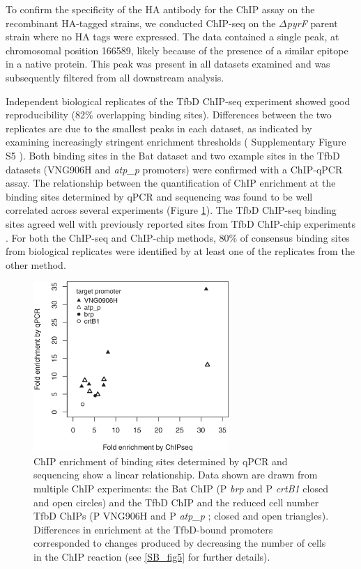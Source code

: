 To confirm the specificity of the HA antibody for the ChIP assay on the recombinant HA-tagged strains, we conducted ChIP-seq on the $\Delta${\em pyrF} parent strain where no HA tags were expressed. The data contained a single peak, at chromosomal position 166589, likely because of the presence of a similar epitope in a native protein. This peak was present in all datasets examined and was subsequently filtered from all downstream analysis.

Independent biological replicates of the TfbD ChIP-seq experiment showed good reproducibility (82\% overlapping binding sites). Differences between the two replicates are due to the smallest peaks in each dataset, as indicated by examining increasingly stringent enrichment thresholds ( Supplementary Figure S5 ). Both binding sites in the Bat dataset and two example sites in the TfbD datasets (VNG906H and {\em atp\_p} promoters) were confirmed with a ChIP-qPCR assay. The relationship between the quantification of ChIP enrichment at the binding sites determined by qPCR and sequencing was found to be well correlated across several experiments (Figure \ref{SB_fig4}). The TfbD ChIP-seq binding sites agreed well with previously reported sites from TfbD ChIP-chip experiments \cite{facciotti_general_2007}. For both the ChIP-seq and ChIP-chip methods, 80\% of consensus binding sites from biological replicates were identified by at least one of the replicates from the other method.

\begin{figure}
\centering
\includegraphics[width=20em]{SaltyBugs/figures/fig4}
\caption{ChIP enrichment of binding sites determined by qPCR and sequencing show a linear relationship. Data shown are drawn from multiple ChIP experiments: the Bat ChIP (P {\em brp} and P {\em crtB1} closed and open circles) and the TfbD ChIP and the reduced cell number TfbD ChIPs (P VNG906H and P {\em atp\_p} ; closed and open triangles). Differences in enrichment at the TfbD-bound promoters corresponded to changes produced by decreasing the number of cells in the ChIP reaction (see \ref{SB_fig5} for further details).}
\label{SB_fig4}
\end{figure}

